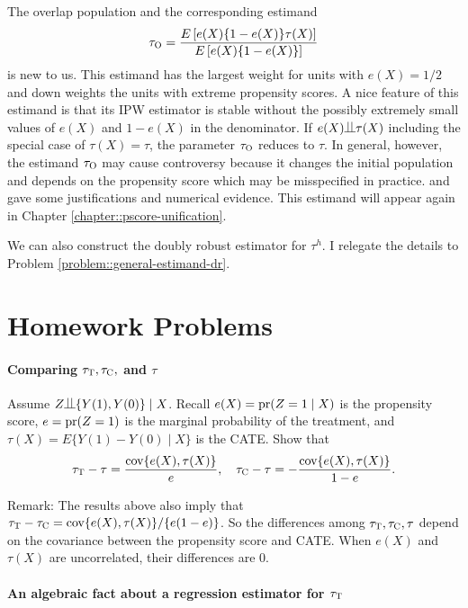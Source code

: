The overlap population and the corresponding estimand
$$
\tau_\textsc{O} = \frac{   E\left[ e(X)\{  1-e(X) \}   \tau(X) \right] }{   E\left[ e(X)\{  1-e(X) \}    \right] }
$$
is new to us. This estimand has the largest weight for units with $e(X) = 1/2$ and down weights the units with extreme propensity scores. 
A nice feature of this estimand is that its IPW estimator is stable without the possibly extremely small values of $e(X)$ and $1-e(X) $ in the denominator. If $ e(X) \ind  \tau(X) $ including the special case of $\tau(X) = \tau$, the parameter $\tau_\textsc{O} $ reduces to $\tau$. In general, however, the estimand $\tau_\textsc{O} $ may cause controversy because it changes the initial population and depends on the propensity score which may be misspecified in practice. \citet{li2018balancing} and \citet{li2019addressing} gave some justifications and numerical evidence.
This estimand will appear again in Chapter \ref{chapter::pscore-unification}. 


We can also construct the doubly robust estimator for $\tau^h$. I relegate the details to Problem \ref{problem::general-estimand-dr}. 
 
 
 \section{Homework Problems}
 
 
\paragraph{Comparing $\tau_\textsc{T},  \tau_\textsc{C}, $ and $\tau$}\label{hw::difference-tau-T-tau} 
 
Assume $Z\ind \{Y(1), Y(0)\} \mid X$.  Recall $e(X) = \textup{pr}(Z=1\mid X)$ is the propensity score,  $e = \textup{pr}(Z=1)$ is the marginal probability of the treatment, and $\tau(X) = E\{  Y(1)-Y(0) \mid X \}$ is the CATE. 
Show that 
$$
\tau_\textsc{T} - \tau = \frac{  \textup{cov}\{ e(X) ,  \tau(X)  \} }{e},\quad
\tau_\textsc{C} - \tau = - \frac{  \textup{cov}\{ e(X) ,  \tau(X)  \} }{1-e}.
$$ 


Remark: The results above also imply that $ \tau_\textsc{T} -  \tau_\textsc{C} =  \textup{cov}\{ e(X) ,  \tau(X)  \} / \{  e(1-e) \}$.  So the differences among $ \tau_\textsc{T} ,   \tau_\textsc{C} , \tau$ depend on the covariance between the propensity score and CATE.   
When $e(X) $ and $  \tau(X) $ are uncorrelated, their differences are 0. 
 
 
\paragraph{An algebraic fact about a regression estimator for $\tau_\textsc{T}$} 
 \label{para::regression-att-algebra}
 
